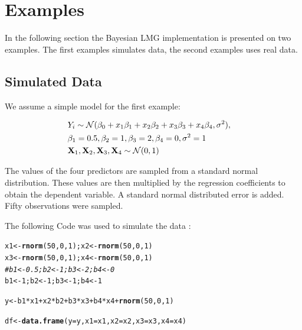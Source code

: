 \documentclass[11pt,a4paper,twoside]{book}
\makeatletter
\newcommand{\hlnum}[1]{\textcolor[rgb]{0.686,0.059,0.569}{#1}}%
\newcommand{\hlcom}[1]{\textcolor[rgb]{0.678,0.584,0.686}{\textit{#1}}}%
\newcommand{\hlopt}[1]{\textcolor[rgb]{0,0,0}{#1}}%
\newcommand{\hlstd}[1]{\textcolor[rgb]{0.345,0.345,0.345}{#1}}%
\newcommand{\hlkwb}[1]{\textcolor[rgb]{0.69,0.353,0.396}{#1}}%
\newcommand{\hlkwc}[1]{\textcolor[rgb]{0.333,0.667,0.333}{#1}}%
\newcommand{\hlkwd}[1]{\textcolor[rgb]{0.737,0.353,0.396}{\textbf{#1}}}%
\newenvironment{kframe}{%
 \def\at@end@of@kframe{}%
 \ifinner\ifhmode%
  \def\at@end@of@kframe{\end{minipage}}%
  \begin{minipage}{\columnwidth}%
 \fi\fi%
 \def\FrameCommand##1{\hskip\@totalleftmargin \hskip-\fboxsep
 \colorbox{shadecolor}{##1}\hskip-\fboxsep
     \hskip-\linewidth \hskip-\@totalleftmargin \hskip\columnwidth}%
 \MakeFramed {\advance\hsize-\width
   \@totalleftmargin\z@ \linewidth\hsize
   \@setminipage}}%
 {\par\unskip\endMakeFramed%
 \at@end@of@kframe}
\newenvironment{knitrout}{}{} %
\makeatother
\begin{document}






\chapter{Examples}

In the following section the Bayesian LMG implementation is presented on two examples. The first examples simulates data, the second examples uses real data.

\section{Simulated Data}

We assume a simple model for the first example: 

\begin{align*} 
&Y_{i} \sim \mathcal{N}(\beta_{0}+x_{1} \beta_{1}+x_{2} \beta_{2}+x_{3} \beta_{3}+x_{4} \beta_{4}, \sigma^2),& \\ & \beta_{1} = 0.5, \beta_{2} = 1,  \beta_{3} = 2 , \beta_{4}=0, \sigma^2 = 1 & \\ & {\mathbf{X}}_{1}, {\mathbf{X}}_{2},{\mathbf{X}}_{3},{\mathbf{X}}_{4} \sim \mathcal{N}(0, 1) 
\end{align*} 


The values of the four predictors are sampled from a standard normal distribution. These values are then multiplied by the regression coefficients to obtain the dependent variable. A standard normal distributed error is added. Fifty observations were sampled.

The following Code was used to simulate the data :

\begin{knitrout}
\color{fgcolor}\begin{kframe}
\begin{alltt}
\hlstd{x1} \hlkwb{<-} \hlkwd{rnorm}\hlstd{(}\hlnum{50}\hlstd{,} \hlnum{0}\hlstd{,} \hlnum{1}\hlstd{); x2} \hlkwb{<-} \hlkwd{rnorm}\hlstd{(}\hlnum{50}\hlstd{,} \hlnum{0}\hlstd{,} \hlnum{1}\hlstd{)}
\hlstd{x3} \hlkwb{<-} \hlkwd{rnorm}\hlstd{(}\hlnum{50}\hlstd{,} \hlnum{0}\hlstd{,} \hlnum{1}\hlstd{); x4} \hlkwb{<-} \hlkwd{rnorm}\hlstd{(}\hlnum{50}\hlstd{,} \hlnum{0}\hlstd{,} \hlnum{1}\hlstd{)}
\hlcom{#b1 <- 0.5; b2 <- 1; b3 <- 2; b4 <- 0}
\hlstd{b1} \hlkwb{<-} \hlnum{1}\hlstd{; b2} \hlkwb{<-} \hlnum{1}\hlstd{; b3} \hlkwb{<-} \hlnum{1}\hlstd{; b4} \hlkwb{<-} \hlnum{1}

\hlstd{y} \hlkwb{<-} \hlstd{b1}\hlopt{*}\hlstd{x1} \hlopt{+} \hlstd{x2}\hlopt{*}\hlstd{b2} \hlopt{+} \hlstd{b3}\hlopt{*}\hlstd{x3} \hlopt{+} \hlstd{b4}\hlopt{*}\hlstd{x4} \hlopt{+} \hlkwd{rnorm}\hlstd{(}\hlnum{50}\hlstd{,} \hlnum{0}\hlstd{,} \hlnum{1}\hlstd{)}

\hlstd{df} \hlkwb{<-} \hlkwd{data.frame}\hlstd{(}\hlkwc{y} \hlstd{= y,} \hlkwc{x1} \hlstd{= x1,} \hlkwc{x2} \hlstd{= x2,} \hlkwc{x3} \hlstd{= x3,} \hlkwc{x4} \hlstd{= x4)}
\end{alltt}
\end{kframe}
\end{knitrout}
\end{document}
